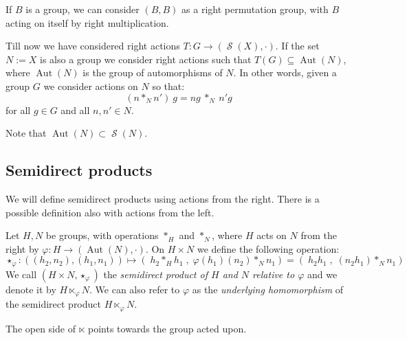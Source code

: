 \documentclass[mat1]{fmfdeloTS2.0}
\newcommand{\obs}{}				%
\DeclareMathOperator{\aut}{\mathrm{Aut}}		%
\DeclareMathOperator{\symm}{\mathcal{S}}		%
\begin{document}
\begin{remark}
If $B$ is a group, we can consider $(B,B)$ as a right permutation group, with $B$ acting on itself by right multiplication.
\label{obs: group acts on itself}
\end{remark}

Till now we have considered right actions $T:G\longrightarrow (\symm(X),\cdot)$. If the set $N:=X$ is also a group we consider right actions such that $T(G)\subseteq \aut(N)$, where $\aut(N)$ is the group of automorphisms of $N$. In other words, given a group $G$ we consider actions on $N$ so that: 
$$(n*_Nn')\:g=ng\:*_N\:n'g$$
for all $g\in G$ and all $n,n'\in N$.

\begin{remark}
Note that $\aut(N)\subset\symm(N)$.
\end{remark}


\subsection{Semidirect products}\label{subsec:semidirect prod}
We will define semidirect products using actions \obs{from the right}. There is a possible definition also with actions from the left.

\begin{definition}
Let $H,N$ be groups, with operations $\ast_H$ and $\ast_N$, where $H$ acts on $N$ \obs{from the right} by $\varphi:H\longrightarrow (\aut(N),\cdot)$. On $H\times N$ we define the following operation:
\[
\star_\varphi:((h_2,n_2),(h_1,n_1))\longmapsto (\; h_2*_H h_1\;,\; \varphi(h_1)(n_2)*_N n_1) =(\; h_2 h_1\;,\; (n_2h_1) *_N n_1) 
\]
We call $(H\times N,\star_\varphi)$ the \emph{semidirect product of $H$ and $N$ relative to $\varphi$} and we denote it by $H\ltimes_{\varphi} N$. We can also refer to $\varphi$ as the \emph{underlying homomorphism} of the semidirect product $H\ltimes_{\varphi} N$.
\end{definition}

The open side of $\ltimes$ points towards the group acted upon.
\end{document}
